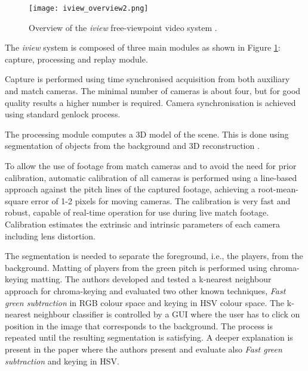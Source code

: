 
\begin{figure}[htbp]
\centerline{\texttt{[image: iview\_overview2.png]}}
\caption{Overview of the \textit{iview} free-viewpoint video system \cite{02_iview}.}
\label{fig:iview_overview}
\end{figure}


The \textit{iview} system is composed of three main modules as shown in Figure \ref{fig:iview_overview}: 
capture, processing and replay module.

Capture is performed using time synchronised acquisition from both auxiliary and
match cameras.
The minimal number of cameras is about four, but for good quality results a higher number is required.
Camera synchronisation is achieved using standard genlock process.

The processing module computes a 3D model of the scene.
This is done using segmentation of objects from the background and 3D reconstruction \cite{2.1_iview}.

To allow the use of footage from match cameras and to avoid the need for prior calibration, 
automatic calibration of all cameras is performed using a line-based approach against the pitch lines of the captured footage, 
achieving a root-mean-square error of 1-2 pixels for moving cameras. 
The calibration is very fast and robust, capable of real-time operation for use during live match footage. 
Calibration estimates the extrinsic and intrinsic parameters of each camera including lens distortion.

The segmentation is needed to separate the foreground, i.e., the players, from the background.
Matting of players from the green pitch is performed using chroma-keying matting. 
The authors developed and tested a k-nearest neighbour approach for chroma-keying and evaluated two other known techniques,
\textit{Fast green subtraction} in RGB colour space and keying in HSV colour space.
The k-nearest neighbour classifier is controlled by a GUI where the user has to click on position in the image that corresponds
to the background. 
The process is repeated until the resulting segmentation is satisfying.
A deeper explanation is present in the paper \cite{2.1_iview} where the authors present and evaluate also 
\textit{Fast green subtraction} and keying in HSV.


